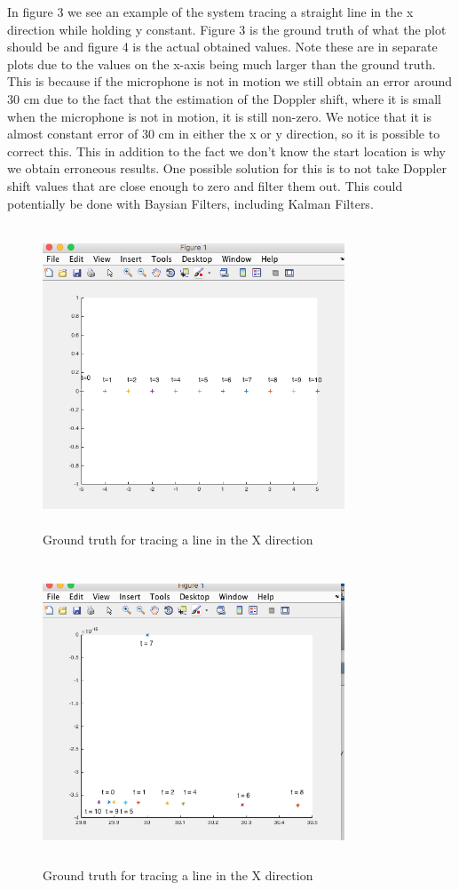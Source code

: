 \documentclass{acm_proc_article-sp}
\begin{document}
In figure 3 we see an example of the system tracing a straight line in the x direction while holding y constant. Figure 3 is the ground truth of what the plot should be and figure 4 is the actual obtained values. Note these are in separate plots due to the values on the x-axis being much larger than the ground truth. This is because if the microphone is not in motion we still obtain an error around 30 cm due to the fact that the estimation of the Doppler shift, where it is small when the microphone is not in motion, it is still non-zero. We notice that it is almost constant error of 30 cm in either the x or y direction, so it is possible to correct this. This in addition to the fact we don't know the start location is why we obtain erroneous results. One possible solution for this is to not take Doppler shift values that are close enough to zero and filter them out. This could potentially be done with Baysian Filters, including Kalman Filters. 

\begin{figure}[h]
\caption{Ground truth for tracing a line in the X direction}
\includegraphics[width=9cm, height=9cm]{groundX}
\end{figure}

\begin{figure}[h]
\caption{Ground truth for tracing a line in the X direction}
\includegraphics[width=9cm, height=9cm]{x}
\end{figure}
\end{document}
